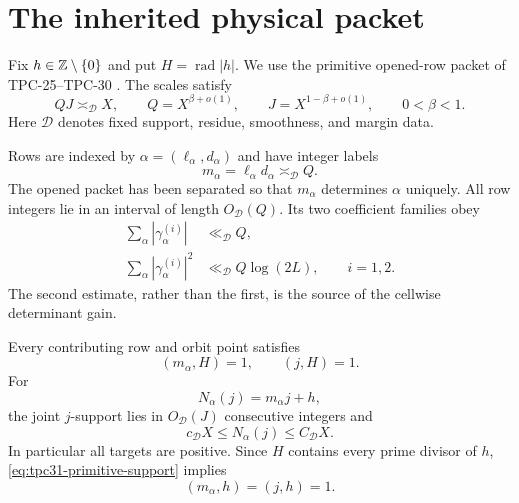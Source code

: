 \section{The inherited physical packet}
\label{sec:tpc31-interface}

Fix $h\in\mathbb Z\setminus\{0\}$ and put $H=\operatorname{rad}|h|$.  We
use the primitive opened-row packet of TPC-25--TPC-30
\citep{WangTPC25,WangTPC28,WangTPC30}.  The scales satisfy
\begin{equation}
 QJ\asymp_{\mathscr D}X,
 \qquad Q=X^{\beta+o(1)},
 \qquad J=X^{1-\beta+o(1)},
 \qquad 0<\beta<1.
 \label{eq:tpc31-scales}
\end{equation}
Here $\mathscr D$ denotes fixed support, residue, smoothness, and
margin data.

Rows are indexed by $\alpha=(\ell_\alpha,d_\alpha)$ and have integer
labels
\begin{equation}
 m_\alpha=\ell_\alpha d_\alpha\asymp_{\mathscr D}Q.
 \label{eq:tpc31-rows}
\end{equation}
The opened packet has been separated so that $m_\alpha$ determines
$\alpha$ uniquely.  All row integers lie in an interval of length
$O_{\mathscr D}(Q)$.  Its two coefficient families obey
\begin{align}
 \sum_\alpha|\gamma_\alpha^{(i)}|
 &\ll_{\mathscr D}Q,
 \label{eq:tpc31-row-l1}\\
 \sum_\alpha|\gamma_\alpha^{(i)}|^2
 &\ll_{\mathscr D}Q\log(2L),
 \qquad i=1,2.
 \label{eq:tpc31-row-l2}
\end{align}
The second estimate, rather than the first, is the source of the
cellwise determinant gain.

Every contributing row and orbit point satisfies
\begin{equation}
 (m_\alpha,H)=1,
 \qquad (j,H)=1.
 \label{eq:tpc31-primitive-support}
\end{equation}
For
\begin{equation}
 N_\alpha(j)=m_\alpha j+h,
 \label{eq:tpc31-target}
\end{equation}
the joint $j$-support lies in $O_{\mathscr D}(J)$ consecutive integers
and
\begin{equation}
 c_{\mathscr D}X\le N_\alpha(j)\le C_{\mathscr D}X.
 \label{eq:tpc31-target-window}
\end{equation}
In particular all targets are positive.  Since $H$ contains every
prime divisor of $h$, \eqref{eq:tpc31-primitive-support} implies
\begin{equation}
 (m_\alpha,h)=(j,h)=1.
 \label{eq:tpc31-full-primitivity}
\end{equation}

